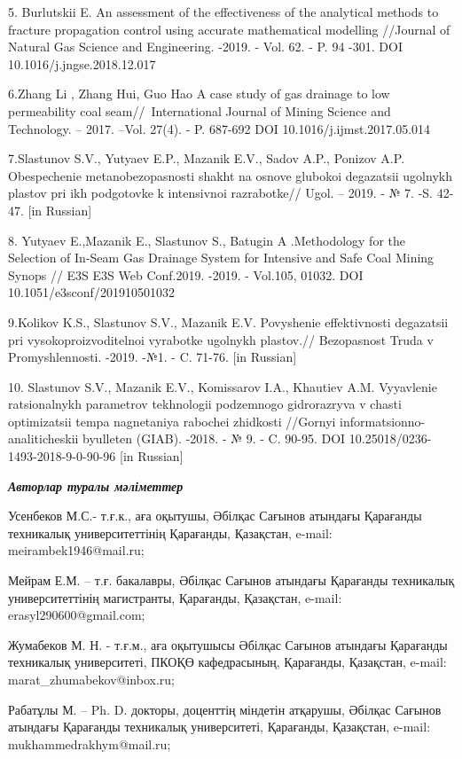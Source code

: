 5. Burlutskii E. An assessment of the effectiveness of the analytical
methods to fracture propagation control using accurate mathematical
modelling //Journal of Natural Gas Science and Engineering. -2019. -
Vol. 62. - P. 94 -301. DOI 10.1016/j.jngse.2018.12.017

6.Zhang Li , Zhang Hui, Guo Hao A case study of gas drainage to low
permeability coal seam//~International Journal of Mining Science and
Technology. -- 2017. --Vol. 27(4). - P. 687-692 DOI
10.1016/j.ijmst.2017.05.014

7.Slastunov S.V., Yutyaev E.P., Mazanik E.V., Sadov A.P., Ponizov A.P.
Obespechenie metanobezopasnosti shakht na osnove glubokoi degazatsii
ugol\textquotesingle nykh plastov pri ikh podgotovke k intensivnoi
razrabotke// Ugol\textquotesingle. -- 2019. - № 7. -S. 42-47. {[}in
Russian{]}

8. Yutyaev E.,Mazanik E., Slastunov S., Batugin A .Methodology for the
Selection of In-Seam Gas Drainage System for Intensive and Safe Coal
Mining Synops // E3S E3S Web Conf.2019. -2019. - Vol.105, 01032. DOI
10.1051/e3sconf/201910501032

9.Kolikov K.S., Slastunov S.V., Mazanik E.V. Povyshenie effektivnosti
degazatsii pri vysokoproizvoditel\textquotesingle noi vyrabotke
ugol\textquotesingle nykh plastov.// Bezopasnost\textquotesingle{} Truda
v Promyshlennosti. -2019. -№1. - C. 71-76. {[}in Russian{]}

10. Slastunov S.V., Mazanik E.V., Komissarov I.A., Khautiev A.M.
Vyyavlenie ratsional\textquotesingle nykh parametrov tekhnologii
podzemnogo gidrorazryva v chasti optimizatsii tempa nagnetaniya rabochei
zhidkosti //Gornyi informatsionno-analiticheskii
byulleten\textquotesingle{} (GIAB). -2018. - № 9. - C. 90-95. DOI
10.25018/0236-1493-2018-9-0-90-96 {[}in Russian{]}

\emph{{\bfseries Авторлар туралы мәліметтер}}

Усенбеков М.С.- т.ғ.к., аға оқытушы, Әбілқас Сағынов атындағы Қарағанды
техникалық университеттінің Қарағанды, Қазақстан, e-mail:
meirambek1946@mail.ru;

Мейрам Е.М. -- т.ғ. бакалавры, Әбілқас Сағынов атындағы Қарағанды
техникалық университеттінің магистранты, Қарағанды, Қазақстан, e-mail:
erasyl290600@gmail.com;

Жумабеков М. Н. - т.ғ.м., аға оқытушысы Әбілқас Сағынов атындағы
Қарағанды техникалық университеті, ПКОҚӨ кафедрасының, Қарағанды,
Қазақстан, e-mail: marat\_zhumabekov@inbox.ru;

Рабатұлы М. -- Ph. D. докторы, доценттің міндетін атқарушы, Әбілқас
Сағынов атындағы Қарағанды техникалық университеті, Қарағанды,
Қазақстан, e-mail: mukhammedrakhym@mail.ru;

